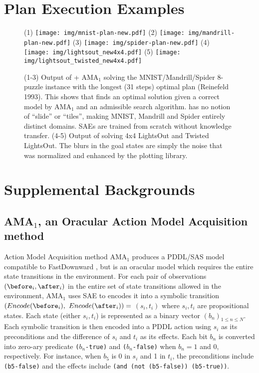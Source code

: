 \documentclass[10pt,letterpaper]{article}
\begin{document}
\clearpage
\section{Plan Execution Examples}

\begin{figure}[h]
 \centering
 (1)
 \texttt{[image: img/mnist-plan-new.pdf]}
 (2)
 \texttt{[image: img/mandrill-plan-new.pdf]}
 (3)
 \texttt{[image: img/spider-plan-new.pdf]}
 (4)
 \texttt{[image: img/lightsout\_new4x4.pdf]}
 (5)
 \texttt{[image: img/lightsout\_twisted\_new4x4.pdf]}
 \caption{
(1-3)
Output of \latentplanner + AMA$_1$ solving the MNIST/Mandrill/Spider 8-puzzle instance
with the longest (31 steps) optimal plan (Reinefeld 1993).
This shows that \latentplanner finds an optimal solution
given a correct model by AMA$_1$ and an admissible search algorithm.
\latentplanner has no notion of ``slide'' or ``tiles'',
making MNIST, Mandrill and Spider entirely distinct domains.
SAEs are trained from scratch without knowledge transfer.
(4-5) Output of solving 4x4 LightsOut and Twisted LightsOut.
The blurs in the goal states are simply the noise that was normalized and enhanced by the plotting library.
}
 \label{fig:mnist}
\end{figure}

\clearpage
\section{Supplemental Backgrounds}

\subsection{AMA$_1$, an Oracular Action Model Acquisition method}

Action Model Acquisition method AMA$_1$ produces a PDDL/SAS model compatible to
FastDownward \cite{Helmert04}, but is an oracular model which requires the entire state transitions
in the environment.
For each pair of observations $\parens{\before_i, \after_i}$ in the entire set of state transitions allowed in the environment,
AMA$_1$ uses SAE to encodes it into 
a symbolic transition $(Encode(\before_i),$ $Encode(\after_i))=$ $(s_i,t_i)$ where $s_i,t_i$ are propositional states.
Each state (either $s_i,t_i$) is represented as a binary vector $(b_n)_{1\leq n \leq N}$.
Each symbolic transition is then encoded into a PDDL action 
using $s_i$ as its preconditions and the difference of $s_i$ and $t_i$ as its effects.
Each bit $b_n$ is converted into zero-ary predicate \texttt{($b_n$-true)} and \texttt{($b_n$-false)}
when $b_n=1$ and $0$, respectively.
For instance, when $b_5$ is 0 in $s_i$ and 1 in $t_i$,
the preconditions include \texttt{(b5-false)} and
the effects include \texttt{(and (not (b5-false)) (b5-true))}.
\end{document}
